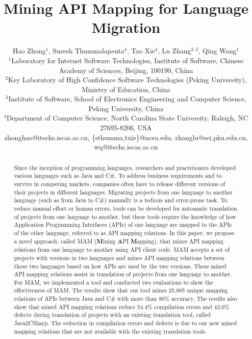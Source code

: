 \documentclass{sig-alternate}
\begin{document}

\title{Mining API Mapping for Language Migration}

\author{
Hao Zhong$^{1}$, Suresh Thummalapenta$^4$, Tao Xie$^4$, Lu Zhang$^{2,3}$, Qing Wang$^{1}$\\
\small{$^1$Laboratory for Internet Software Technologies, Institute of Software, Chinese Academy of Sciences, Beijing, 100190, China}\\
\small{$^2$Key Laboratory of High Confidence Software Technologies (Peking University), Ministry of Education, China}\\
\small{$^3$Institute of Software, School of Electronics Engineering and Computer Science, Peking University, China} \\
\small{$^4$Department of Computer Science, North Carolina State University, Raleigh, NC 27695-8206, USA}\\
\small{zhonghao@itechs.iscas.ac.cn, \{sthumma,txie\}@ncsu.edu,
zhanglu@sei.pku.edu.cn, wq@itechs.iscas.ac.cn}}

\maketitle
\thispagestyle{empty}

\begin{abstract}
Since the inception of programming languages, researchers and
practitioners developed various languages such as Java and C\#. To
address business requirements and to survive in competing markets,
companies often have to release different versions of their projects
in different languages. Migrating projects from one language to
another language (such as from Java to C\#) manually is a tedious
and error-prone task. To reduce manual effort or human errors, tools
can be developed for automatic translation of projects from one
language to another, but these tools require the knowledge of how
Application Programming Interfaces (APIs) of one language are mapped
to the APIs of the other language, referred to as API mapping
relations. In this paper, we propose a novel approach,
called MAM (\textbf{M}ining \textbf{A}PI
\textbf{M}apping), that mines API
mapping relations from one language to another using API client
code. MAM accepts a set of projects with versions in
two languages and mines API mapping relations between those two
languages based on how APIs are used by the two versions. These
mined API mapping relations assist in translation of projects from
one language to another. For MAM, we implemented a tool and
conducted two evaluations to show the effectiveness of MAM. The
results show that our tool mines 25,805 unique mapping relations of
APIs between Java and C\# with more than 80\% accuracy. The results
also show that mined API mapping relations reduce 54.4\% compilation
errors and 43.0\% defects during translation of projects with an
existing translation tool, called Java2CSharp. The reduction in
compilation errors and defects is due to our new mined mapping
relations that are not available with the existing translation
tools.
\end{abstract}
\end{document}
